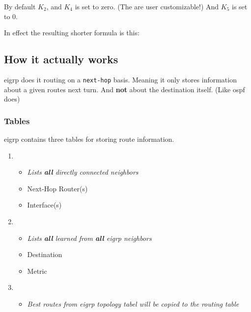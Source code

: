 
By default $K_2$, and $K_4$ is set to zero. (The are user customizable!) And $K_5$ is set to 0.

In effect the resulting shorter formula is this:


\subsection{How it actually works}

\gls{eigrp} does it routing on a \texttt{next-hop} basis. Meaning it only stores information about a given routes next turn. And \textbf{not} about the destination itself. (Like \gls{ospf} does)

\subsubsection{Tables}

\gls{eigrp} contains three tables for storing route information.

\begin{enumerate}
    \item {}
    \begin{itemize}
        \item \textit{Lists \textbf{all} directly connected neighbors}
        \item Next-Hop Router(s)
        \item Interface(s)
    \end{itemize}
    \item {}
    \begin{itemize}
        \item \textit{Lists \textbf{all} learned from \textbf{all} \gls{eigrp} neighbors}
        \item Destination
        \item Metric
    \end{itemize}
    \item {}
    \begin{itemize}
        \item \textit{Best routes from \gls{eigrp} topology tabel will be copied to the routing table}
    \end{itemize}
\end{enumerate}

